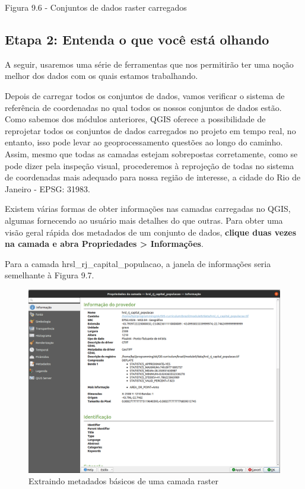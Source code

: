 \documentclass[
]{krantz}
\begin{document}
Figura 9.6 - Conjuntos de dados raster carregados

\hypertarget{etapa-2-entenda-o-que-vocuxea-estuxe1-olhando-1}{%
\subsection{Etapa 2: Entenda o que você está olhando}\label{etapa-2-entenda-o-que-vocuxea-estuxe1-olhando-1}}

A seguir, usaremos uma série de ferramentas que nos permitirão ter uma noção melhor dos dados com os quais estamos trabalhando.

Depois de carregar todos os conjuntos de dados, vamos verificar o sistema de referência de coordenadas no qual todos os nossos conjuntos de dados estão. Como sabemos dos módulos anteriores, QGIS oferece a possibilidade de reprojetar todos os conjuntos de dados carregados no projeto em tempo real, no entanto, isso pode levar ao geoprocessamento questões ao longo do caminho. Assim, mesmo que todas as camadas estejam sobrepostas corretamente, como se pode dizer pela inspeção visual, procederemos à reprojeção de todas no sistema de coordenadas mais adequado para nossa região de interesse, a cidade do Rio de Janeiro - EPSG: 31983.

Existem várias formas de obter informações nas camadas carregadas no QGIS, algumas fornecendo ao usuário mais detalhes do que outras. Para obter uma visão geral rápida dos metadados de um conjunto de dados, \textbf{clique duas vezes na camada e abra Propriedades \textgreater{} Informações}.

Para a camada hrsl\_rj\_capital\_populacao, a janela de informações seria semelhante à Figura 9.7.

\begin{figure}
\centering
\includegraphics{media/modulo9/fig97.png}
\caption{Extraindo metadados básicos de uma camada raster}
\end{figure}
\end{document}
